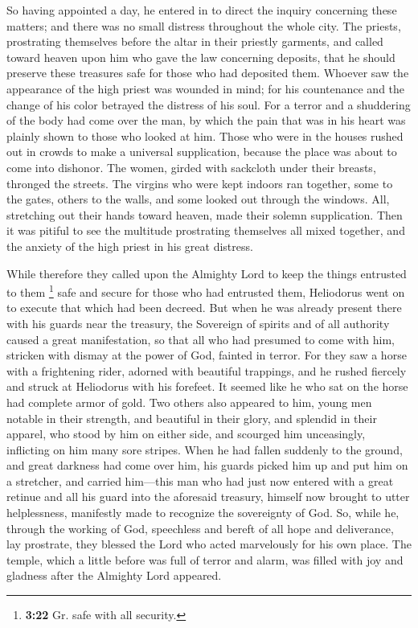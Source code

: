  So having appointed a day, he entered in to direct the
inquiry concerning these matters; and there was no small distress
throughout the whole city.  The priests, prostrating
themselves before the altar in their priestly garments, and called
toward heaven upon him who gave the law concerning deposits, that he
should preserve these treasures safe for those who had deposited them.
 Whoever saw the appearance of the high priest was
wounded in mind; for his countenance and the change of his color
betrayed the distress of his soul.  For a terror and a
shuddering of the body had come over the man, by which the pain that was
in his heart was plainly shown to those who looked at him.
 Those who were in the houses rushed out in crowds to
make a universal supplication, because the place was about to come into
dishonor.  The women, girded with sackcloth under their
breasts, thronged the streets. The virgins who were kept indoors ran
together, some to the gates, others to the walls, and some looked out
through the windows.  All, stretching out their hands
toward heaven, made their solemn supplication.  Then it
was pitiful to see the multitude prostrating themselves all mixed
together, and the anxiety of the high priest in his great distress.

 While therefore they called upon the Almighty Lord to
keep the things entrusted to them \footnote{\textbf{3:22} Gr. safe with
  all security.} safe and secure for those who had entrusted them,
 Heliodorus went on to execute that which had been
decreed.  But when he was already present there with his
guards near the treasury, the Sovereign of spirits and of all authority
caused a great manifestation, so that all who had presumed to come with
him, stricken with dismay at the power of God, fainted in terror.
 For they saw a horse with a frightening rider, adorned
with beautiful trappings, and he rushed fiercely and struck at
Heliodorus with his forefeet. It seemed like he who sat on the horse had
complete armor of gold.  Two others also appeared to him,
young men notable in their strength, and beautiful in their glory, and
splendid in their apparel, who stood by him on either side, and scourged
him unceasingly, inflicting on him many sore stripes. 
When he had fallen suddenly to the ground, and great darkness had come
over him, his guards picked him up and put him on a stretcher,
 and carried him---this man who had just now entered with
a great retinue and all his guard into the aforesaid treasury, himself
now brought to utter helplessness, manifestly made to recognize the
sovereignty of God.  So, while he, through the working of
God, speechless and bereft of all hope and deliverance, lay prostrate,
 they blessed the Lord who acted marvelously for his own
place. The temple, which a little before was full of terror and alarm,
was filled with joy and gladness after the Almighty Lord appeared.

